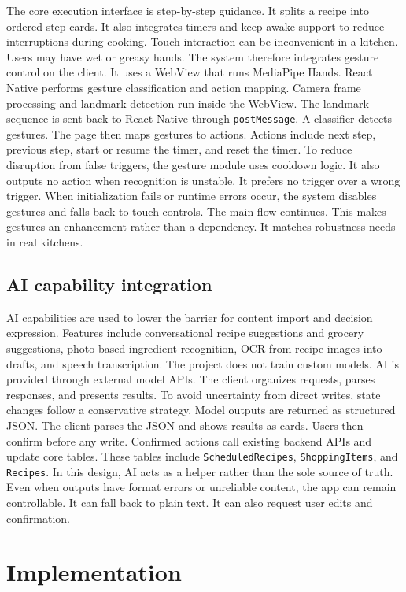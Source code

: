 \documentclass[journal]{IEEEtran}
\begin{document}
The core execution interface is step-by-step guidance. It splits a recipe into ordered step cards. It also integrates timers and keep-awake support to reduce interruptions during cooking. Touch interaction can be inconvenient in a kitchen. Users may have wet or greasy hands. The system therefore integrates gesture control on the client. It uses a WebView that runs MediaPipe Hands. React Native performs gesture classification and action mapping. Camera frame processing and landmark detection run inside the WebView. The landmark sequence is sent back to React Native through \texttt{postMessage}. A classifier detects gestures. The page then maps gestures to actions. Actions include next step, previous step, start or resume the timer, and reset the timer. To reduce disruption from false triggers, the gesture module uses cooldown logic. It also outputs no action when recognition is unstable. It prefers no trigger over a wrong trigger. When initialization fails or runtime errors occur, the system disables gestures and falls back to touch controls. The main flow continues. This makes gestures an enhancement rather than a dependency. It matches robustness needs in real kitchens.

\subsection{AI capability integration}

AI capabilities are used to lower the barrier for content import and decision expression. Features include conversational recipe suggestions and grocery suggestions, photo-based ingredient recognition, OCR from recipe images into drafts, and speech transcription. The project does not train custom models. AI is provided through external model APIs. The client organizes requests, parses responses, and presents results. To avoid uncertainty from direct writes, state changes follow a conservative strategy. Model outputs are returned as structured JSON. The client parses the JSON and shows results as cards. Users then confirm before any write. Confirmed actions call existing backend APIs and update core tables. These tables include \texttt{ScheduledRecipes}, \texttt{ShoppingItems}, and \texttt{Recipes}. In this design, AI acts as a helper rather than the sole source of truth. Even when outputs have format errors or unreliable content, the app can remain controllable. It can fall back to plain text. It can also request user edits and confirmation.

\section{Implementation}
\end{document}
